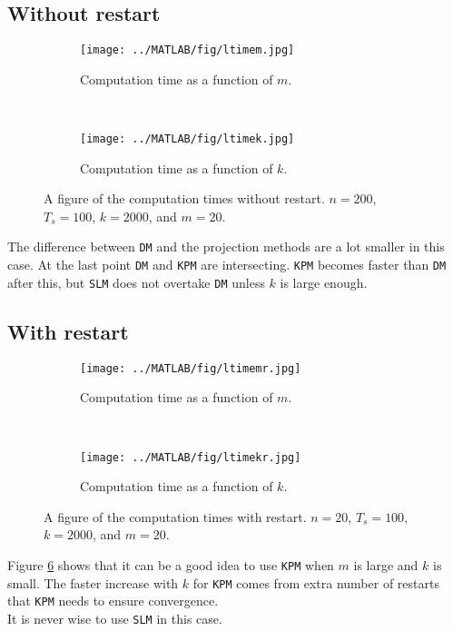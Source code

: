 \subsection{Without restart}
%
\begin{figure}[H]
        \centering
        \begin{subfigure}[b]{0.45\textwidth}
                \texttt{[image: ../MATLAB/fig/ltimem.jpg]}
                \caption{ Computation time as a function of $m$. }
                \label{fig:ltimem}
        \end{subfigure}
        ~
        \begin{subfigure}[b]{0.45\textwidth}
                \texttt{[image: ../MATLAB/fig/ltimek.jpg]}
                \caption{ Computation time as a function of $k$. }
                \label{fig:ltimek}
        \end{subfigure}
        \caption{ A figure of the computation times without restart. $n = 200$, $T_s = 100$, $k = 2000$, and $m = 20$. }
        \label{fig:ltime0}
\end{figure}
The difference between \texttt{DM} and the projection methods are a lot smaller in this case. At the last point \texttt{DM} and \texttt{KPM} are intersecting. \texttt{KPM} becomes faster than \texttt{DM} after this, but \texttt{SLM} does not overtake \texttt{DM} unless $k$ is large enough. \\

\subsection{With restart}

\begin{figure}[H]
        \centering
        \begin{subfigure}[b]{0.45\textwidth}
                \texttt{[image: ../MATLAB/fig/ltimemr.jpg]}
                \caption{ Computation time as a function of $m$. }
                \label{fig:ltimemr}
        \end{subfigure}
        ~
        \begin{subfigure}[b]{0.45\textwidth}
                \texttt{[image: ../MATLAB/fig/ltimekr.jpg]}
                \caption{ Computation time as a function of $k$. }
                \label{fig:ltimekr}
        \end{subfigure}
        \caption{ A figure of the computation times with restart. $n = 20$, $T_s = 100$, $k = 2000$, and $m = 20$. }
        \label{fig:ltime1}
\end{figure}
Figure \ref{fig:ltime1} shows that it can be a good idea to use \texttt{KPM} when $m$ is large and $k$ is small. The faster increase with $k$ for \texttt{KPM} comes from extra number of restarts that \texttt{KPM} needs to ensure convergence. \\
It is never wise to use \texttt{SLM} in this case.
